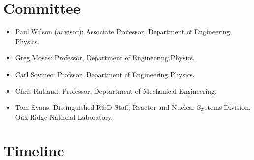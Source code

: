 \documentclass[letterpaper,12pt]{article}
\begin{document}
\section{Committee}

\begin{itemize}
\item Paul Wilson (advisor): Associate Professor, Department of
  Engineering Physics.
\item Greg Moses: Professor, Department of Engineering Physics.
\item Carl Sovinec: Profssor, Department of Engineering Physics.
\item Chris Rutland: Professor, Deptartment of Mechanical Engineering.
\item Tom Evans: Distinguished R\&D Staff, Reactor and Nuclear Systems
  Division, Oak Ridge National Laboratory.

\end{itemize}

\section{Timeline}

\pagebreak


\end{document}
